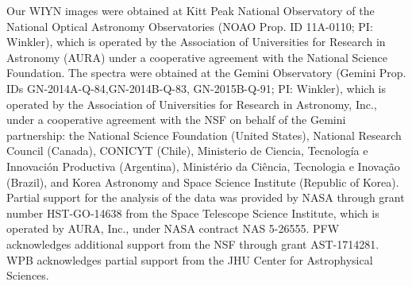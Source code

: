 \acknowledgments

Our WIYN images were obtained at Kitt Peak National Observatory of the National Optical Astronomy Observatories (NOAO Prop. ID 11A-0110; PI: Winkler), which is operated by the Association of Universities for Research in Astronomy (AURA) under a cooperative agreement with the National Science Foundation. The spectra were obtained at the Gemini Observatory (Gemini Prop. IDs GN-2014A-Q-84,GN-2014B-Q-83, GN-2015B-Q-91; PI: Winkler), which is operated by the Association of Universities for Research in Astronomy, Inc., under a cooperative agreement with the NSF on behalf of the Gemini partnership: the National Science Foundation (United States), National Research Council (Canada), CONICYT (Chile), Ministerio de Ciencia, Tecnolog\'{i}a e Innovaci\'{o}n Productiva (Argentina), Minist\'{e}rio da Ci\^{e}ncia, Tecnologia e Inova\c{c}\~{a}o (Brazil), and Korea Astronomy and Space Science Institute (Republic of Korea).  Partial support for the analysis of the data was provided by NASA through grant number HST-GO-14638 from the Space Telescope Science Institute, which is operated by AURA, Inc., under NASA contract NAS 5-26555. PFW acknowledges additional support from the NSF through grant AST-1714281.  WPB acknowledges partial support from the JHU Center for Astrophysical Sciences.

\vspace{5mm}




\pagebreak





\clearpage




\startlongtable

\clearpage




